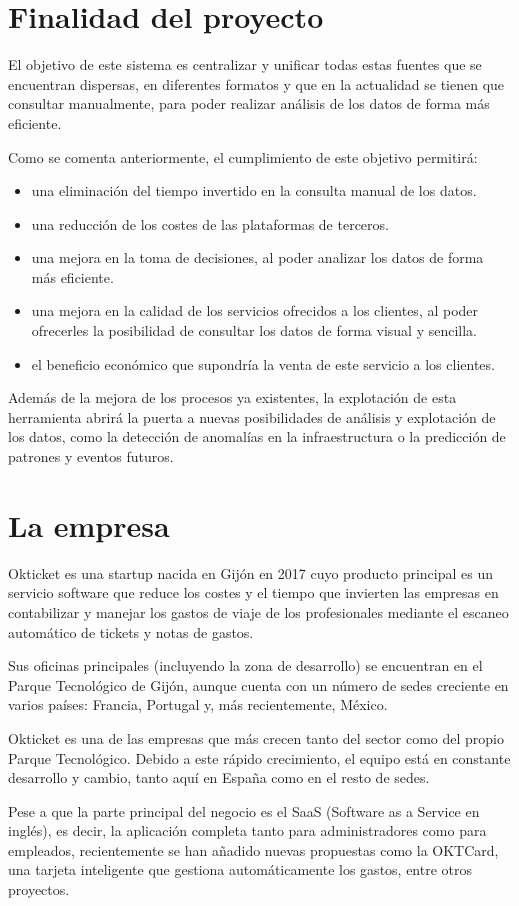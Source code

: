 \section{Finalidad del proyecto}\label{sec:finalidad}
El objetivo de este sistema es centralizar y unificar todas estas fuentes que se encuentran
dispersas, en diferentes formatos y que en la actualidad se tienen que consultar manualmente,
para poder realizar análisis de los datos de forma más eficiente.

Como se comenta anteriormente, el cumplimiento de este objetivo permitirá:
\begin{itemize}
	\item una eliminación del tiempo invertido en la consulta manual de los datos.
	\item una reducción de los costes de las plataformas de terceros.
	\item una mejora en la toma de decisiones, al poder analizar los datos de forma más eficiente.
	\item una mejora en la calidad de los servicios ofrecidos a los clientes, al poder ofrecerles
	      la posibilidad de consultar los datos de forma visual y sencilla.
	\item el beneficio económico que supondría la venta de este servicio a los clientes.
\end{itemize}

Además de la mejora de los procesos ya existentes, la explotación de esta herramienta abrirá la
puerta a nuevas posibilidades de análisis y explotación de los datos, como la detección de
anomalías en la infraestructura o la predicción de patrones y eventos futuros.

\section{La empresa}\label{sec:empresa}
Okticket es una startup nacida en Gijón en 2017 cuyo producto principal es un servicio software
que reduce los costes y el tiempo que invierten las empresas en contabilizar y manejar los gastos
de viaje de los profesionales mediante el escaneo automático de tickets y notas de gastos.

Sus oficinas principales (incluyendo la zona de desarrollo) se encuentran en el Parque
Tecnológico de Gijón, aunque cuenta con un número de sedes creciente en varios países:
Francia, Portugal y, más recientemente, México.

Okticket es una de las empresas que más crecen tanto del sector como del propio Parque
Tecnológico. Debido a este rápido crecimiento, el equipo está en constante desarrollo y
cambio, tanto aquí en España como en el resto de sedes.

Pese a que la parte principal del negocio es el SaaS (Software as a Service en inglés),
es decir, la aplicación completa tanto para administradores como para empleados,
recientemente se han añadido nuevas propuestas como la OKTCard, una tarjeta inteligente
que gestiona automáticamente los gastos, entre otros proyectos.
